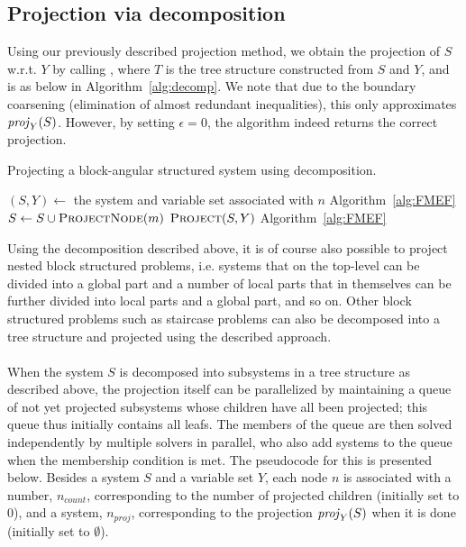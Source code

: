 \subsection{Projection via decomposition}
Using our previously described projection method, we obtain the projection of $S$ w.r.t. $Y$ by calling , where $T$ is the tree structure constructed from $S$ and $Y$, and  is as below in Algorithm~\ref{alg:decomp}. We note that due to the boundary coarsening (elimination of almost redundant inequalities), this only approximates $\mathit{proj}_Y(S)$. However, by setting $\epsilon = 0$, the algorithm indeed returns the correct projection.

\begin{algorithm}
\caption{{Projecting a block-angular structured system using decomposition.}}
\label{alg:decomp}
\begin{algorithmic}
	\State $(S,Y)\gets$ the system and variable set associated with $n$
		\State \Return {}\Comment Algorithm~\ref{alg:FMEF}
	\Else
			\State $S \gets S\cup \Call{ProjectNode}{m}$ 
		\EndFor
		\State \Return $\Call{Project}{S, Y}$ \Comment Algorithm~\ref{alg:FMEF}
	\EndIf
\EndFunction
\end{algorithmic}
\end{algorithm}
%

\noindent Using the decomposition described above, it is of course also possible to project nested block structured problems, i.e. systems that on the top-level can be divided into a global part and a number of local parts that in themselves can be further divided into local parts and a global part, and so on.  
Other block structured problems such as staircase problems can also be decomposed into a tree structure and projected using the described approach. 
\\\\
When the system $S$ is decomposed into subsystems in a tree structure as described above, the projection itself can be parallelized by maintaining a queue of not yet projected subsystems whose children have all been projected; this queue thus initially contains all leafs. 
The members of the queue are then solved independently by multiple solvers in parallel, who also add systems to the queue when the membership condition is met.
The pseudocode for this is presented below. Besides a system $S$ and a variable set $Y$, each node $n$ is associated with a number, $n_{count}$, corresponding to the number of projected children (initially set to $0$), and a system, $n_{proj}$, corresponding to the projection $\mathit{proj}_Y(S)$ when it is done (initially set to $\emptyset$). 
\vspace{1mm}

